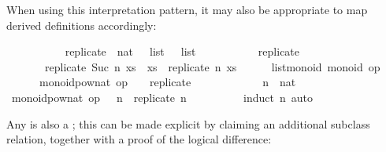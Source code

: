 \begin{isabellebody}
\begin{isamarkuptext}
  When using this interpretation pattern, it may also
  be appropriate to map derived definitions accordingly:%
\end{isamarkuptext}%
\isamarkuptrue%
\ \ \ \ \isamarkupfalse%
\isanewline
\ \ \ \ \ \ replicate\ {\isacharcolon}{\isacharcolon}\ {\isachardoublequoteopen}nat\ {\isasymRightarrow}\ {\isasymalpha}\ list\ {\isasymRightarrow}\ {\isasymalpha}\ list{\isachardoublequoteclose}\isanewline
\ \ \ \ \isanewline
\ \ \ \ \ \ {\isachardoublequoteopen}replicate\ {}\ {\isacharunderscore}\ {\isacharequal}\ {\isacharbrackleft}{\isacharbrackright}{\isachardoublequoteclose}\isanewline
\ \ \ \ \ \ {\isacharbar}\ {\isachardoublequoteopen}replicate\ {\isacharparenleft}Suc\ n{\isacharparenright}\ xs\ {\isacharequal}\ xs\ {\isacharat}\ replicate\ n\ xs{\isachardoublequoteclose}\isanewline
\isanewline
\ \ \ \ \isamarkupfalse%
\ list{\isacharunderscore}monoid{\isacharcolon}\ monoid\ {\isacharbrackleft}{\isachardoublequoteopen}op\ {\isacharat}{\isachardoublequoteclose}\ {\isachardoublequoteopen}{\isacharbrackleft}{\isacharbrackright}{\isachardoublequoteclose}{\isacharbrackright}\ \isanewline
\ \ \ \ \ \ {\isachardoublequoteopen}monoid{\isachardot}pow{\isacharunderscore}nat\ {\isacharparenleft}op\ {\isacharat}{\isacharparenright}\ {\isacharbrackleft}{\isacharbrackright}\ {\isacharequal}\ replicate{\isachardoublequoteclose}\isanewline
%
\isadelimproof
\ \ \ \ %
\endisadelimproof
%
\isatagproof
{}\isamarkupfalse%
\isanewline
\ \ \ \ \ \ \isamarkupfalse%
\ n\ {\isacharcolon}{\isacharcolon}\ nat\isanewline
\ \ \ \ \ \ \isamarkupfalse%
\ {\isachardoublequoteopen}monoid{\isachardot}pow{\isacharunderscore}nat\ {\isacharparenleft}op\ {\isacharat}{\isacharparenright}\ {\isacharbrackleft}{\isacharbrackright}\ n\ {\isacharequal}\ replicate\ n{\isachardoublequoteclose}\isanewline
\ \ \ \ \ \ \ \ \isamarkupfalse%
\ {\isacharparenleft}induct\ n{\isacharparenright}\ auto\isanewline
\ \ \ \ \isamarkupfalse%
%
\endisatagproof
{\isafoldproof}%
%
\isadelimproof
%
\endisadelimproof
%
\isamarkuptrue%
%
\begin{isamarkuptext}%
Any  is also a ;  this
  can be made explicit by claiming an additional
  subclass relation,
  together with a proof of the logical difference:%
\end{isamarkuptext}%
\isamarkuptrue%
\ \ \ \ \isamarkupfalse%

\end{isabellebody}
